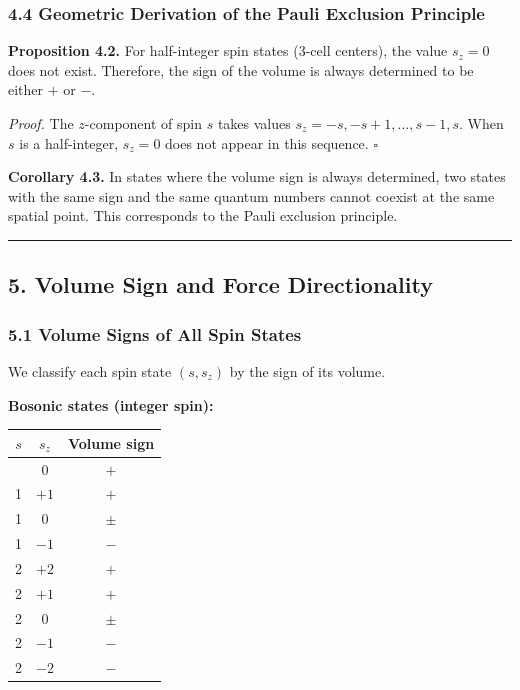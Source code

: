 \documentclass[a4paper,11pt]{article}
\newcounter{none}
\begin{document}
\subsubsection*{4.4 Geometric Derivation of the Pauli Exclusion Principle}

\textbf{Proposition 4.2.} For half-integer spin states (3-cell centers), the value $s_z = 0$ does not exist. Therefore, the sign of the volume is always determined to be either $+$ or $-$.

\emph{Proof.} The $z$-component of spin $s$ takes values $s_z = -s, -s+1, \ldots, s-1, s$. When $s$ is a half-integer, $s_z = 0$ does not appear in this sequence. $\square$

\textbf{Corollary 4.3.} In states where the volume sign is always determined, two states with the same sign and the same quantum numbers cannot coexist at the same spatial point. This corresponds to the Pauli exclusion principle.

\begin{center}\rule{0.5\linewidth}{0.5pt}\end{center}

\subsection*{5. Volume Sign and Force Directionality}

\subsubsection*{5.1 Volume Signs of All Spin States}

We classify each spin state $(s, s_z)$ by the sign of its volume.

\textbf{Bosonic states (integer spin):}

{\def\LTcaptype{none}
\begin{longtable}[]{@{}ccc@{}}
\toprule
$s$ & $s_z$ & Volume sign \\
\midrule
\endhead
\bottomrule
\endlastfoot
0 & 0 & $+$ \\
1 & $+1$ & $+$ \\
1 & $0$ & $\pm$ \\
1 & $-1$ & $-$ \\
2 & $+2$ & $+$ \\
2 & $+1$ & $+$ \\
2 & $0$ & $\pm$ \\
2 & $-1$ & $-$ \\
2 & $-2$ & $-$ \\
\end{longtable}
}
\end{document}
